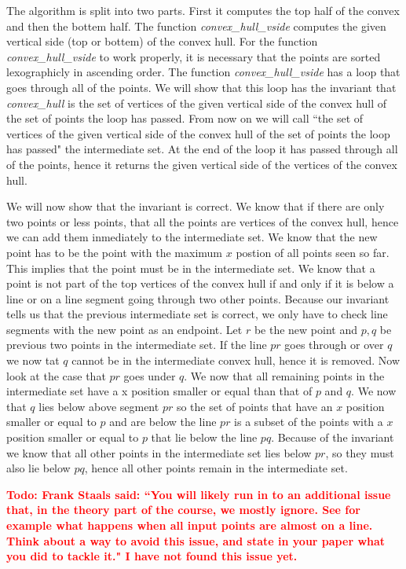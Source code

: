 \documentclass{article}
\newcommand{\todo}[1]{\textbf{\textcolor{red}{Todo: #1}}}
\begin{document}
The algorithm is split into two parts. First it computes the top half of the
convex and then the bottem half. The function \textit{convex_hull_vside}
computes the given vertical side (top or bottem) of the convex hull. For the
function \textit{convex_hull_vside} to work properly, it is necessary that
the points are sorted lexographicly in ascending order. The function
\textit{convex_hull_vside} has a loop that goes through all of the points. We
will show that this loop has the invariant that \textit{convex_hull} is the set
of vertices of the given vertical side of the convex hull of the set of points the
loop has passed. From now on we will call ``the set of vertices of the given vertical side of the convex hull of the set of points the 
loop has passed" the intermediate set. At the end of the loop it has passed through all of the points,
hence it returns the given vertical side of the vertices of the convex hull.

We will now show that the invariant is correct. We know that if there are only two
points or less points, that all the points are vertices of the convex hull, hence
we can add them inmediately to the intermediate set. We know that the new point has to be the point with
the maximum $x$ postion of all points seen so far. 
This implies that the point must be in the intermediate set. We know that a point is not part of the top vertices
of the convex hull if and only if it is below a line or on a line segment going through two other points. Because our invariant
tells us that the previous intermediate set is correct, we only have to check line segments with the new point as an endpoint.
Let $r$ be the new point and $p,q$ be previous two points in the intermediate set. If the line $pr$ goes through or over $q$
we now tat $q$ cannot be in the intermediate convex hull, hence it is removed.
Now look at the case that $pr$ goes under $q$. We now that all remaining points
in the intermediate
set have a x position smaller or equal than that of $p$ and $q$. We now that $q$ lies below above segment $pr$ so the set
of points that have an $x$ position smaller or equal to $p$ and are below the line $pr$ is a subset of the points
with a $x$ position smaller or equal to $p$ that lie below the line $pq$. Because of the invariant we know that all other
points in the intermediate set lies below $pr$, so they must also lie below $pq$, hence all other points remain in the
intermediate set.

\todo{Frank Staals said: ``You will likely run in to an additional issue that, in the theory part of the course, we mostly ignore. See for example what happens when all input points are almost on a line. Think about a way to avoid this issue, and state in your paper what you did to tackle it." I have not found this issue yet.}
\end{document}
